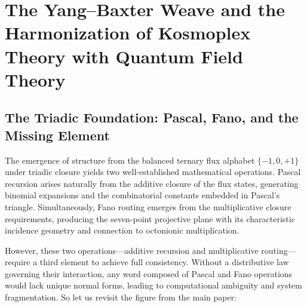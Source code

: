 \documentclass[pdflatex,sn-mathphys-num]{sn-jnl}
\theoremstyle{thmstyleone}
\theoremstyle{thmstyletwo}
\theoremstyle{thmstylethree}
\begin{document}
\section{The Yang--Baxter Weave and the Harmonization of Kosmoplex Theory with Quantum Field Theory}

\subsection{The Triadic Foundation: Pascal, Fano, and the Missing Element}

The emergence of structure from the balanced ternary flux alphabet $\{-1, 0, +1\}$ under triadic closure yields two well-established mathematical operations. Pascal recursion arises naturally from the additive closure of the flux states, generating binomial expansions and the combinatorial constants embedded in Pascal's triangle. Simultaneously, Fano routing emerges from the multiplicative closure requirements, producing the seven-point projective plane with its characteristic incidence geometry and connection to octonionic multiplication.

However, these two operations---additive recursion and multiplicative routing---require a third element to achieve full consistency. Without a distributive law governing their interaction, any word composed of Pascal and Fano operations would lack unique normal forms, leading to computational ambiguity and system fragmentation.  So let us revisit the figure from the main paper:
\end{document}
